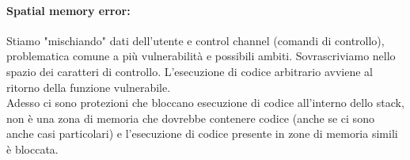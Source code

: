\paragraph{Spatial memory error:} Stiamo "mischiando" dati dell'utente e control channel (comandi di controllo), problematica comune a più vulnerabilità e possibili ambiti. Sovrascriviamo nello spazio dei caratteri di controllo. L'esecuzione di codice arbitrario avviene al ritorno della funzione vulnerabile.\\

Adesso ci sono protezioni che bloccano esecuzione di codice all'interno dello stack, non è una zona di memoria che dovrebbe contenere codice (anche se ci sono anche casi particolari) e l'esecuzione di codice presente in zone di memoria simili è bloccata.\\

